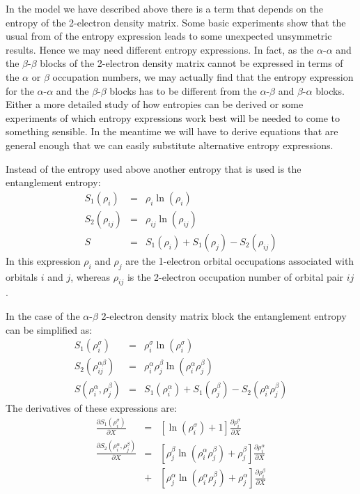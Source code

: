 \documentclass[pra]{revtex4-1}
\begin{document}
In the model we have described above there is a term that depends on the entropy
of the 2-electron density matrix. Some basic experiments show that the usual from
of the entropy expression leads to some unexpected unsymmetric results. Hence we
may need different entropy expressions. In fact, as the $\alpha$-$\alpha$ and the 
$\beta$-$\beta$ blocks of the 2-electron density matrix cannot be expressed in
terms of the $\alpha$ or $\beta$ occupation numbers, we may actually find that 
the entropy expression for the $\alpha$-$\alpha$ and the $\beta$-$\beta$ blocks
has to be different from the $\alpha$-$\beta$ and $\beta$-$\alpha$ blocks.
Either a more detailed study of how entropies can be derived or some experiments
of which entropy expressions work best will be needed to come to something 
sensible. In the meantime we will have to derive equations that are general
enough that we can easily substitute alternative entropy expressions.

Instead of the entropy used above another entropy that is used is the entanglement
entropy:
\begin{eqnarray}
   S_1(\rho_i)    &=& \rho_i\ln(\rho_i) \\
   S_2(\rho_{ij}) &=& \rho_{ij}\ln(\rho_{ij}) \\
   S              &=& S_1(\rho_i)+S_1(\rho_j)-S_2(\rho_{ij})
\end{eqnarray}
In this expression $\rho_i$ and $\rho_j$ are the 1-electron orbital occupations
associated with orbitals $i$ and $j$, whereas $\rho_{ij}$ is the 2-electron
occupation number of orbital pair $ij$.

In the case of the $\alpha$-$\beta$ 2-electron density matrix block the
entanglement entropy can be simplified as:
\begin{eqnarray}
   S_1(\rho^\sigma_i)            &=& \rho^\sigma_i\ln(\rho^\sigma_i) \\
   S_2(\rho^{\alpha\beta}_{ij})  &=& \rho^\alpha_i\rho^\beta_j\ln(\rho^\alpha_i\rho^\beta_j) \\
   S(\rho^\alpha_i,\rho^\beta_j) &=& S_1(\rho^\alpha_i)+S_1(\rho^\beta_j)-S_2(\rho^\alpha_i\rho^\beta_j)
\end{eqnarray}
The derivatives of these expressions are:
\begin{eqnarray}
   \frac{\partial S_1(\rho^\sigma_i)}{\partial X}
   &=& \left[\ln(\rho^\sigma_i)+1\right]\frac{\partial\rho^\sigma_i}{\partial X} \\
   \frac{\partial S_2(\rho^\alpha_i,\rho^\beta_j)}{\partial X}
   &=& \left[\rho^\beta_j\ln(\rho^\alpha_i\rho^\beta_j)+\rho^\beta_j\right]
       \frac{\partial\rho^\alpha_i}{\partial X} \nonumber \\
   &+& \left[\rho^\alpha_j\ln(\rho^\alpha_i\rho^\beta_j)+\rho^\alpha_j\right]
       \frac{\partial\rho^\beta_i}{\partial X}
\end{eqnarray}
\end{document}
